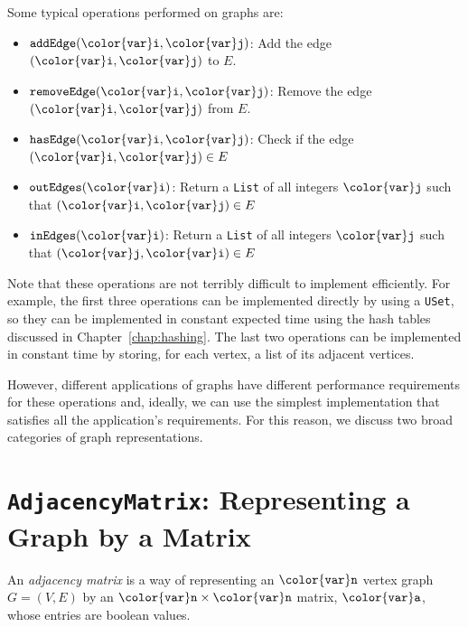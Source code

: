 \documentclass[10pt]{book}
\newcommand{\chapref}[1]{Chapter~\ref{chap:#1}}
\newcommand{\seclabel}[1]{\label{sec:#1}}
\theoremstyle{plain}
\theoremstyle{definition}
\begin{document}
Some typical operations performed on graphs are:
\begin{itemize}
  \item \ensuremath{\mathtt{addEdge({\color{var}i},{\color{var}j})}}: Add the edge $(\ensuremath{\mathtt{{\color{var}i}}},\ensuremath{\mathtt{{\color{var}j}}})$ to $E$.
  \item \ensuremath{\mathtt{removeEdge({\color{var}i},{\color{var}j})}}: Remove the edge $(\ensuremath{\mathtt{{\color{var}i}}},\ensuremath{\mathtt{{\color{var}j}}})$ from $E$.
  \item \ensuremath{\mathtt{hasEdge({\color{var}i},{\color{var}j})}}: Check if the edge $(\ensuremath{\mathtt{{\color{var}i}}},\ensuremath{\mathtt{{\color{var}j}}})\in E$ 
  \item \ensuremath{\mathtt{outEdges({\color{var}i})}}: Return a \texttt{List} of all integers $\ensuremath{\mathtt{{\color{var}j}}}$ such that
  $(\ensuremath{\mathtt{{\color{var}i}}},\ensuremath{\mathtt{{\color{var}j}}})\in E$
  \item \ensuremath{\mathtt{inEdges({\color{var}i})}}: Return a \texttt{List} of all integers $\ensuremath{\mathtt{{\color{var}j}}}$ such that
  $(\ensuremath{\mathtt{{\color{var}j}}},\ensuremath{\mathtt{{\color{var}i}}})\in E$
\end{itemize}

Note that these operations are not terribly difficult to implement
efficiently. For example, the first three operations can be implemented
directly by using a \texttt{USet}, so they can be implemented in constant
expected time using the hash tables discussed in \chapref{hashing}.
The last two operations can be implemented in constant time by storing,
for each vertex, a list of its adjacent vertices.

However, different applications of graphs have different performance
requirements for these operations and, ideally, we can use the simplest
implementation that satisfies all the application's requirements.
For this reason, we discuss two broad categories of graph representations.

\section{\texttt{AdjacencyMatrix}: Representing a Graph by a Matrix}
\seclabel{adjacency-matrix}

%
An \emph{adjacency matrix} is a way of representing an \ensuremath{\mathtt{{\color{var}n}}} vertex graph
$G=(V,E)$ by an $\ensuremath{\mathtt{{\color{var}n}}}\times\ensuremath{\mathtt{{\color{var}n}}}$ matrix, \ensuremath{\mathtt{{\color{var}a}}}, whose entries are boolean
values.
\end{document}

